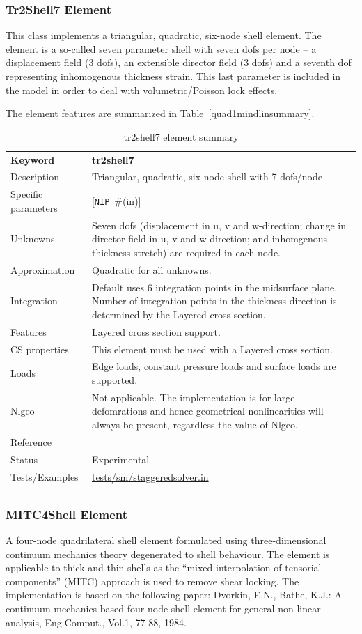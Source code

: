 \documentclass[a4paper]{article}
\newcommand{\param}[1]{\texttt{#1}} %
\newcommand{\optional}[1]{[#1]} %
\newcommand{\field}[2]{\param{#1}~\#{\tiny(#2)}} %
\newcommand{\optField}[2]{\optional{\field{#1}{#2}}}
\newcommand{\templabel}{}%
\newcommand{\tempcaption}{}%
\newcounter{nelpar}
\newenvironment{elementsummary}[5]{%
  \gdef\tempcaption{#4}%
  \gdef\templabel{#5}%
  \setcounter{nelpar}{0}%
  \begin{center} %
    \begin{table}[!htb] %
      \begin{tabular}{|l|p{9cm}|}\hline %
        {\bf Keyword} & \bf{#1}\\ %
        {Description} & {#2}\\ %
        {Specific parameters} & {#3}\\ \hline %
}{
  \\ \hline %
      \end{tabular}%
      \caption{\tempcaption}%
      \label{\templabel}%
    \end{table}%
  \end{center}%
}
\newcommand{\elementDescription}[2]{{#1} & {#2}\\}
\begin{document}
\subsubsection{Tr2Shell7 Element} \label{tr2shell7}
This class implements a triangular, quadratic, six-node shell element. The element is a so-called seven parameter shell with seven dofs per node -- a displacement field (3 dofs), an extensible director field (3 dofs) and a seventh dof representing inhomogenous thickness strain. This last parameter is included in the model in order to deal with volumetric/Poisson lock effects.

The element features are summarized in Table~\ref{quad1mindlinsummary}.

\begin{elementsummary}{tr2shell7}{Triangular, quadratic, six-node shell with 7 dofs/node}{\optField{NIP}{in}}{tr2shell7 element summary}{tr2shell7summary}

\elementDescription{Unknowns}{Seven dofs (displacement in u, v and w-direction; change in director field in u, v and w-direction; and inhomgenous thickness stretch) are required in each node.}
\elementDescription{Approximation}{Quadratic for all unknowns.}
\elementDescription{Integration}{Default uses 6 integration points in the midsurface plane. Number of integration points in the thickness direction is determined by the Layered cross section.}
\elementDescription{Features}{Layered cross section support.}
\elementDescription{CS properties}{This element must be used with a Layered cross section.}
\elementDescription{Loads}{Edge loads, constant pressure loads and surface loads are supported.}
\elementDescription{Nlgeo}{Not applicable. The implementation is for large defomrations and hence geometrical nonlinearities will always be present, regardless the value of Nlgeo.}
\elementDescription{Reference}{\cite{RagnarLarsson2011}}
\elementDescription{Status}{Experimental}
\elementDescription{Tests/Examples}{\href{https://github.com/oofem/oofem/blob/devel/tests/sm/staggeredsolver.in}{tests/sm/staggeredsolver.in}}
\end{elementsummary}



\subsubsection {MITC4Shell Element}
A four-node quadrilateral shell element formulated using three-dimensional continuum mechanics theory degenerated to shell behaviour. The element is applicable to thick and thin shells as the ``mixed interpolation of tensorial components'' (MITC) approach is used to remove shear locking. The implementation is based on the following paper: Dvorkin, E.N., Bathe, K.J.: A continuum mechanics based four-node shell element for general non-linear analysis, Eng.Comput., Vol.1, 77-88, 1984. 
\end{document}
